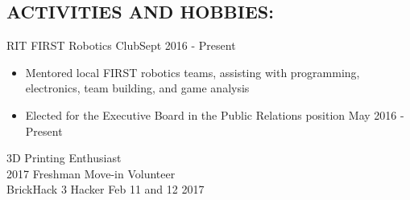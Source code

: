 \documentclass[line,margin]{res}
\begin{document}
\begin{resume}
\section{ACTIVITIES AND HOBBIES:}


	RIT FIRST Robotics Club\hfill Sept 2016 - Present
	\begin{itemize}
		\item Mentored local FIRST robotics teams, assisting with programming, electronics, team building, and game analysis
		\item Elected for the Executive Board in the Public Relations position \hfill May 2016 - Present
	\end{itemize}
\vspace{-5pt}

	3D Printing Enthusiast \\
	2017 Freshman Move-in Volunteer \\
	BrickHack 3 Hacker \hfill Feb 11 and 12 2017

%
%
%
%
\end{resume}
\end{document}
